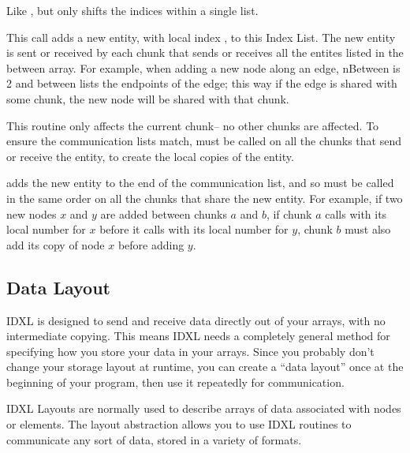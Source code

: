 Like , but only shifts the indices within a single list.



This call adds a new entity, with local index , to this Index List.  The new entity is sent or received by each chunk that sends or receives all the entites listed in the between array.  For example, when adding a new node along an edge, nBetween is 2 and between lists the endpoints of the edge; this way if the edge is shared with some chunk, the new node will be shared with that chunk.

This routine only affects the current chunk-- no other chunks are affected.  To ensure the communication lists match,  must be called on all the chunks that send or receive the entity, to create the local copies of the entity.

 adds the new entity to the end of the communication list, and so must be called in the same order on all the chunks that share the new entity.  For example, if two new nodes $x$ and $y$ are added between chunks $a$ and $b$, if chunk $a$ calls  with its local number for $x$ before it calls  with its local number for $y$, chunk $b$ must also add its copy of node $x$ before adding $y$.


\subsection{Data Layout}
\label{sec:IDXLLayout}
IDXL is designed to send and receive data directly out of your arrays, with no intermediate copying.  This means IDXL needs a completely general method for specifying how you store your data in your arrays.  Since you probably don't change your storage layout at runtime, you can create a ``data layout'' once at the beginning of your program, then use it repeatedly for communication.

IDXL Layouts are normally used to describe arrays of data associated with nodes or elements.  The layout abstraction allows you to use IDXL routines to communicate any sort of data, stored in a variety of formats.

